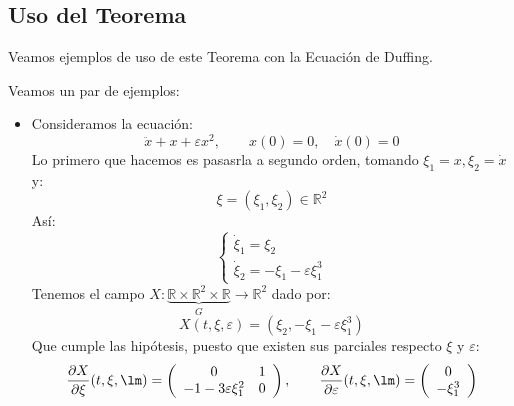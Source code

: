 \subsection{Uso del Teorema}
\noindent
Veamos ejemplos de uso de este Teorema con la Ecuación de Duffing.
\begin{ejemplo}
    Veamos un par de ejemplos:
    \begin{itemize}
        \item Consideramos la ecuación:
            \begin{equation*}
                \ddot{x} + x + \varepsilon x^2, \qquad x(0) = 0, \quad \dot{x}(0) = 0
            \end{equation*}
            Lo primero que hacemos es pasasrla a segundo orden, tomando $\xi_1 = x, \xi_2 = \dot{x}$ y:
            \begin{equation*}
                \xi = (\xi_1, \xi_2)\in \mathbb{R}^2
            \end{equation*}
            Así:
            \begin{equation*}
                \left\{\begin{array}{l}
                        \dot{\xi}_1 = \xi_2 \\
                        \dot{\xi}_2 = -\xi_1 - \varepsilon\xi_1^3
                \end{array}\right.
            \end{equation*}
            Tenemos el campo $X:\underbrace{\mathbb{R}\times\mathbb{R}^2\times\mathbb{R}}_G\to\mathbb{R}^2$ dado por:
            \begin{equation*}
                X(t,\xi,\varepsilon) = (\xi_2, -\xi_1-\varepsilon\xi_1^3)
            \end{equation*}
            Que cumple las hipótesis, puesto que existen sus parciales respecto $\xi$ y $\varepsilon$:
            \begin{equation*}
                \frac{\partial X}{\partial \xi}(t,\xi,\lm) = \left(\begin{array}{cc}
                    0 & 1 \\
                    -1-3\varepsilon\xi_1^2 & 0 
                \end{array}\right), \qquad \frac{\partial X}{\partial \varepsilon}(t,\xi,\lm) = \left(\begin{array}{cc}
                    0 \\
                    -\xi_1^3 
                \end{array}\right)
            \end{equation*}

\end{itemize}
\end{ejemplo}
